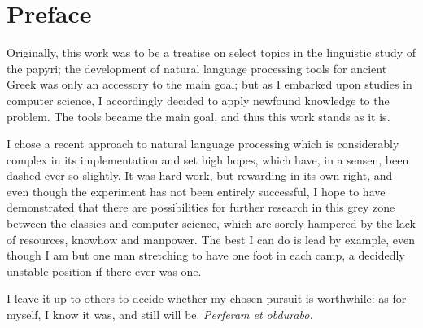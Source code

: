 \chapter{Preface}
\label{chap:preface}
\mtcaddchapter

Originally, this work was to be a treatise on select topics in the
linguistic study of the papyri; the development of natural language
processing tools for ancient Greek was only an accessory to the main
goal; but as I embarked upon studies in computer science, I
accordingly decided to apply newfound knowledge to the problem. The
tools became the main goal, and thus this work stands as it is.

I chose a recent approach to natural language processing which is
considerably complex in its implementation and set high hopes, which
have, in a sensen, been dashed ever so slightly. It was hard work, but
rewarding in its own right, and even though the experiment has not
been entirely successful, I hope to have demonstrated that there are
possibilities for further research in this grey zone between the
classics and computer science, which are sorely hampered by the lack
of resources, knowhow and manpower. The best I can do is lead by
example, even though I am but one man stretching to have one foot in
each camp, a decidedly unstable position if there ever was one.

I leave it up to others to decide whether my chosen pursuit is
worthwhile: as for myself, I know it was, and still will
be. \textit{Perferam et obdurabo.}
